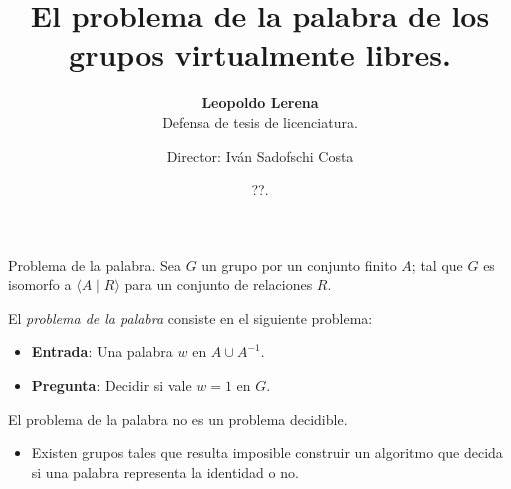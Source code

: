 \documentclass[aspectratio=169, 11pt]{beamer}
\title{El problema de la palabra de los grupos virtualmente libres.}
\subtitle{\textbf{Leopoldo Lerena} \\
		Defensa de tesis de licenciatura.}
\date{??.}
\author{Director: Iván Sadofschi Costa}
\institute{Universidad de Buenos Aires}
\begin{document}
	\maketitle

	
	
	
	\begin{frame}[fragile]{Problema de la palabra.}
		Sea $G$ un grupo \fg por un conjunto finito $A$; 
		tal que $G$ es isomorfo a $\langle A \mid R \rangle$ para un conjunto de relaciones $R$.
		
		El \emph{problema de la palabra} consiste en el siguiente problema:
	
		\begin{itemize}
					\item 
						\textbf{Entrada}: Una palabra $w$ en $A \cup A^{-1}$.
					
					\item 
						\textbf{Pregunta}: Decidir si vale $w=1$ en $G$.
		\end{itemize}

		El problema de la palabra no es un problema \alert{decidible}.
		\begin{itemize}
			\item 
				Existen grupos tales que resulta imposible construir un algoritmo que decida si una palabra representa la identidad o no.
		\end{itemize}
		

	\end{frame}
\end{document}
